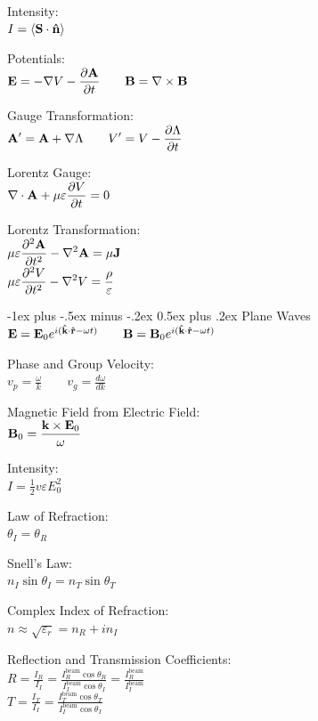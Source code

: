 \documentclass[12pt,landscape]{article}
\makeatletter
\renewcommand{\section}{\@startsection{section}{1}{0mm}%
                                {-1ex plus -.5ex minus -.2ex}%
                                {0.5ex plus .2ex}%
                                {\normalfont\normalsize\bfseries}}
\newcommand{\tab}{\hspace{.02\textwidth}}
\newcommand{\ds}{\displaystyle}
\renewcommand{\dv}[2]{\frac{d#1}{d#2}}
\renewcommand{\grad}{\nabla}
\renewcommand{\curl}[1]{\nabla\times#1}
\renewcommand{\div}[1]{\nabla\cdot#1}
\renewcommand{\cross}{\times}
\makeatother
\begin{document}
\begin{multicols}{3}
Intensity:\\
\tab $I = \langle \vb{S}\cdot\vu{n}\rangle$

Potentials:\\
\tab $\ds \vb{E} = -\grad{V} - \pdv{\vb{A}}{t} \qquad \vb{B} = \curl{\vb{B}}$

Gauge Transformation:\\
\tab $\ds \vb{A^\prime} = \vb{A} + \grad{\Lambda} \qquad V^\prime = V - \pdv{\Lambda}{t}$

Lorentz Gauge:\\
\tab $\ds \div{\vb{A}} + \mu\varepsilon\pdv{V}{t} = 0$

Lorentz Transformation:\\
\tab $\ds \mu\varepsilon\pdv[2]{\vb{A}}{t} - \laplacian{\vb{A}} = \mu\vb{J}$\\
\tab $\ds \mu\varepsilon\pdv[2]{V}{t} - \laplacian{V} = \frac{\rho}{\varepsilon}$

\section{Plane Waves}
$\vb{E} = \vb{E}_0e^{i(\vu{k}\cdot\vu{r} - \omega t)} \qquad \vb{B} = \vb{B}_0e^{i(\vu{k}\cdot\vu{r} - \omega t)}$

Phase and Group Velocity:\\
\tab $\ds v_p = \frac{\omega}{k} \qquad \ds v_g = \dv{\omega}{k}$

\columnbreak

Magnetic Field from Electric Field:\\
\tab $\ds \vb{B}_0 = \frac{\vb{k}\cross\vb{E}_0}{\omega}$

Intensity:\\
\tab $I = \frac{1}{2}v\varepsilon E_0^2$

Law of Refraction:\\
\tab $\theta_I = \theta_R$

Snell's Law:\\
\tab $n_I \sin\theta_I = n_T\sin\theta_T$

Complex Index of Refraction:\\
\tab $\ds n \approx \sqrt{\varepsilon_r} = n_R + in_I$

Reflection and Transmission Coefficients:\\
\tab $\ds R = \frac{I_R}{I_I} = \frac{I^\text{beam}_R\cos\theta_R}{I^\text{beam}_I\cos\theta_I} =\frac{I^\text{beam}_R}{I^\text{beam}_I}$\\
\tab $\ds T = \frac{I_T}{I_I} = \frac{I^\text{beam}_T\cos\theta_T}{I^\text{beam}_I\cos\theta_I}$


\end{multicols}
\end{document}

